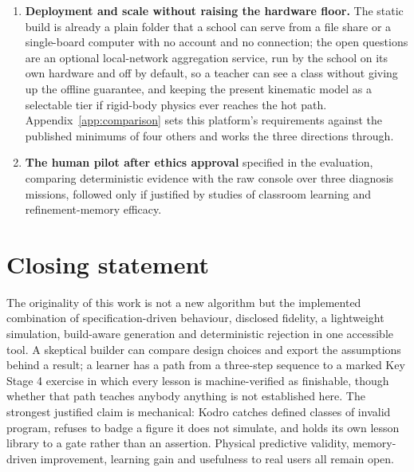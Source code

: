 \documentclass[11pt,a4paper]{report}
\begin{document}
\begin{enumerate}
\item {} \textbf{Deployment and scale without raising the hardware floor.} The static build is already a plain folder that a school can serve from a file share or a single-board computer with no account and no connection; the open questions are an optional local-network aggregation service, run by the school on its own hardware and off by default, so a teacher can see a class without giving up the offline guarantee, and keeping the present kinematic model as a selectable tier if rigid-body physics ever reaches the hot path. Appendix~\ref{app:comparison} sets this platform's requirements against the published minimums of four others and works the three directions through.
\item {} \textbf{The human pilot after ethics approval} specified in the evaluation, comparing deterministic evidence with the raw console over three diagnosis missions, followed only if justified by studies of classroom learning and refinement-memory efficacy.
\end{enumerate}

\section{Closing statement}
 The originality of this work is not a new algorithm but the implemented combination of specification-driven behaviour, disclosed fidelity, a lightweight simulation, build-aware generation and deterministic rejection in one accessible tool. A skeptical builder can compare design choices and export the assumptions behind a result; a learner has a path from a three-step sequence to a marked Key Stage 4 exercise in which every lesson is machine-verified as finishable, though whether that path teaches anybody anything is not established here. The strongest justified claim is mechanical: Kodro catches defined classes of invalid program, refuses to badge a figure it does not simulate, and holds its own lesson library to a gate rather than an assertion. Physical predictive validity, memory-driven improvement, learning gain and usefulness to real users all remain open.
\end{document}
